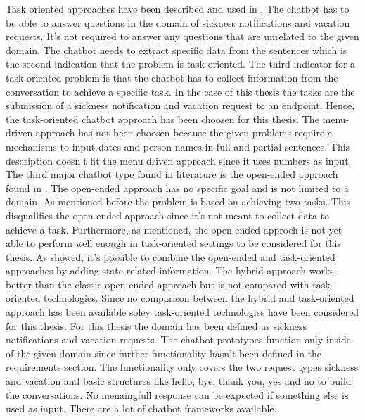 Task oriented approaches have been described and used in 
\citet{deshpande2017survey, luis2015williams, braunEvaluatingNLU, williams2017hybrid}.
The chatbot has to be able to answer questions in the domain of sickness notifications 
and vacation requests.
It's not required to answer any questions that are unrelated to the given domain.
The chatbot needs to extract specific data from the sentences which is the second 
indication that the problem is task-oriented.
The third indicator for a task-oriented problem is that the chatbot has to collect information from the 
conversation to achieve a specific task.
In the case of this thesis the tasks are the submission of a sickness notification
and vacation request to an endpoint. 
Hence, the task-oriented chatbot approach has been choosen for this thesis.
The menu-driven approach has not been choosen because the given problems 
require a mechanisms to input dates and person names in full and partial sentences.
This description doesn't fit the menu driven approach since it uses numbers as input.
The third major chatbot type found in literature is the open-ended approach found in 
\citet{williams2017hybrid, bordes2016learning, rahman2017programming}.
The open-ended approach has no specific goal and is not limited to a domain.
As mentioned before the problem is based on achieving two tasks.
This disqualifies the open-ended approach since it's not meant to
collect data to achieve a task.
Furthermore, as \citet{bordes2016learning} mentioned, the open-ended approch is not 
yet able to perform well enough in task-oriented settings to be considered for this 
thesis.
As \citet{williams2017hybrid} showed, it's possible to combine the open-ended and 
task-oriented approaches by adding state related information.
The hybrid approach works better than the classic open-ended approach but 
is not compared with task-oriented technologies.
Since no comparison between the hybrid and task-oriented approach has been available 
soley task-oriented technologies have been considered for this thesis.
For this thesis the domain has been defined as sickness notifications and 
vacation requests.
The chatbot prototypes function only inside of the given domain since further 
functionality hasn't been defined in the requirements section.
The functionality only covers the two request types sickness and vacation and 
basic structures like hello, bye, thank you, yes and no to build the conversations.
No menaingfull response can be expected if something else is used as input.
There are a lot of chatbot frameworks available.
